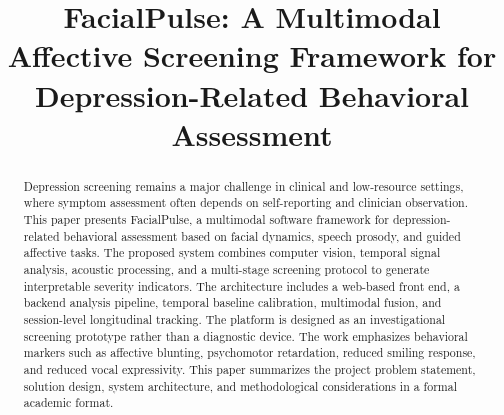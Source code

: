 \documentclass[conference, 12pt]{IEEEtran}
\begin{document}
\title{FacialPulse: A Multimodal Affective Screening Framework for Depression-Related Behavioral Assessment}

\author{
}




\maketitle

\begin{abstract}
Depression screening remains a major challenge in clinical and low-resource settings, where symptom assessment often depends on self-reporting and clinician observation. This paper presents FacialPulse, a multimodal software framework for depression-related behavioral assessment based on facial dynamics, speech prosody, and guided affective tasks. The proposed system combines computer vision, temporal signal analysis, acoustic processing, and a multi-stage screening protocol to generate interpretable severity indicators. The architecture includes a web-based front end, a backend analysis pipeline, temporal baseline calibration, multimodal fusion, and session-level longitudinal tracking. The platform is designed as an investigational screening prototype rather than a diagnostic device. The work emphasizes behavioral markers such as affective blunting, psychomotor retardation, reduced smiling response, and reduced vocal expressivity. This paper summarizes the project problem statement, solution design, system architecture, and methodological considerations in a formal academic format.
\end{abstract}
\end{document}
